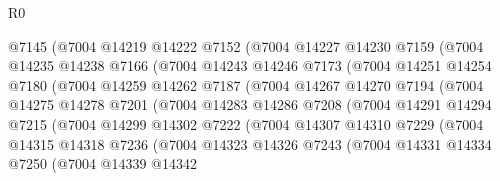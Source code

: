 \begin{lexlean}{R0}
\begin{coremodule}
                  @7145
                  (@7004
                    @14219
                    @14222
                    @7152
                    (@7004
                      @14227
                      @14230
                      @7159
                      (@7004
                        @14235
                        @14238
                        @7166
                        (@7004
                          @14243
                          @14246
                          @7173
                          (@7004
                            @14251
                            @14254
                            @7180
                            (@7004
                              @14259
                              @14262
                              @7187
                              (@7004
                                @14267
                                @14270
                                @7194
                                (@7004
                                  @14275
                                  @14278
                                  @7201
                                  (@7004
                                    @14283
                                    @14286
                                    @7208
                                    (@7004
                                      @14291
                                      @14294
                                      @7215
                                      (@7004
                                        @14299
                                        @14302
                                        @7222
                                        (@7004
                                          @14307
                                          @14310
                                          @7229
                                          (@7004
                                            @14315
                                            @14318
                                            @7236
                                            (@7004
                                              @14323
                                              @14326
                                              @7243
                                              (@7004
                                                @14331
                                                @14334
                                                @7250
                                                (@7004
                                                  @14339
                                                  @14342

\end{coremodule}
\end{lexlean}
